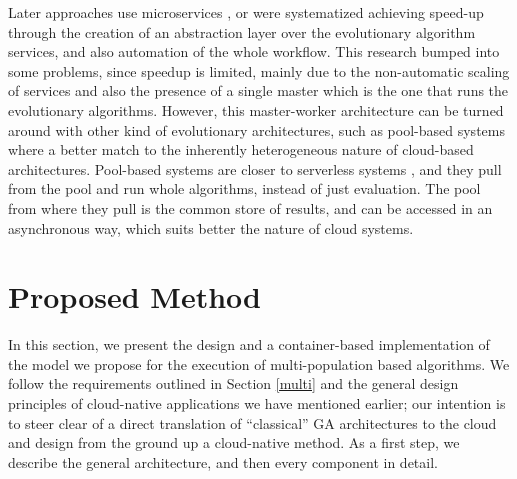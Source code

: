 \documentclass[review]{elsarticle}
\begin{document}
Later approaches use microservices \cite{khalloof2018generic}, or were
systematized \cite{salza2019speed} achieving speed-up through the
creation of an abstraction layer over the evolutionary algorithm
services, and also automation of the whole workflow. This research
bumped into some problems, since speedup is limited, mainly due to the
non-automatic scaling of services and also the presence of a single
master which is the one that runs the evolutionary
algorithms. However, this master-worker architecture can be turned
around with other kind of evolutionary architectures, such
as pool-based systems
\cite{valenzuela2015implementing,merelo2012sofea,sofea:cec2012} where
a better match to the inherently heterogeneous nature of cloud-based
architectures. Pool-based systems are closer to serverless systems
\cite{malawski2017serverless}, and they pull from the pool and run
whole algorithms, instead of just evaluation. The pool from where they
pull is the common store of results, and can be accessed in an
asynchronous way, which suits better the nature of cloud systems.

\section{Proposed Method} 
\label{method} 

In this section, we present the design
and a container-based implementation of the model we propose for the execution
of multi-population based algorithms. We follow the requirements outlined in
Section \ref{multi} and the general design principles of cloud-native
applications we have mentioned earlier; our intention is to steer
clear of a direct translation of ``classical'' GA architectures to the
cloud and design from the ground up a cloud-native method. As a first step, we describe the general
architecture, and then  every component in detail. 
\end{document}
